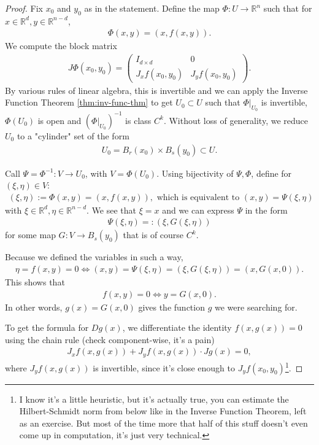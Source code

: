 \begin{proof}
	Fix $x_{0}$ and $y_{0}$ as in the statement. Define the map $\Phi: U \to \mathbb{R}^{n}$ such that for $x \in \mathbb{R}^{d}, y \in \mathbb{R}^{n-d}$,
	\begin{align*}
		\Phi(x,y) = (x, f(x,y)).
	\end{align*}
	We compute the block matrix
	\begin{align*}
		J\Phi(x_{0}, y_{0}) =
		\left(\begin{array}{c|c}
				      I_{d \times d}              & 0                    \\
				      \hline J_{x}f(x_{0}, y_{0}) & J_{y}f(x_{0}, y_{0})
			      \end{array}\right).
	\end{align*}
	By various rules of linear algebra, this is invertible and we can apply the Inverse Function Theorem \ref{thm:inv-func-thm} to get $U_{0} \subset U$ such that $\Phi|_{U_{0}}$ is invertible, $\Phi(U_{0})$ is open and $(\Phi|_{U_{0}})^{-1}$ is class $C^{k}$. Without loss of generality, we reduce $U_{0}$ to a "cylinder" set of the form
    \begin{align*}
        U_{0} = B_{r}(x_{0}) \times B_{s}(y_{0}) \subset U.
    \end{align*}

	Call $\Psi = \Phi^{-1}: V \to U_{0}$, with $V = \Phi(U_{0})$. Using bijectivity of $\Psi, \Phi$, define for $(\xi, \eta) \in V$:
	\begin{align*}
		(\xi, \eta) := \Phi(x,y) = (x, f(x,y)), \text{ which is equivalent to } (x,y) = \Psi(\xi, \eta)
	\end{align*}
	with $\xi  \in \mathbb{R}^{d}, \eta \in \mathbb{R}^{n-d}$. We see that $\xi = x$ and we can express $\Psi$ in the form
	\begin{align*}
		\Psi(\xi, \eta) =: (\xi, G(\xi, \eta))
	\end{align*}
	for some map $G: V \to B_{s}(y_{0})$ that is of course $C^{k}$. 

	Because we defined the variables in such a way, 
	\begin{align*}
		\eta = f(x,y) = 0 \iff (x,y) = \Psi(\xi, \eta) = (\xi, G(\xi, \eta)) = (x, G(x, 0)).
	\end{align*}
	This shows that
	\begin{align*}
		f(x,y) = 0 \iff y = G(x,0).
	\end{align*}
    In other words, $g(x) = G(x,0)$ gives the function $g$ we were searching for.

	To get the formula for $Dg(x)$, we differentiate the identity $f(x,g(x)) = 0$ using the chain rule (check component-wise, it's a pain)
	\begin{align*}
		J_{x}f(x,g(x)) + J_{y}f(x,g(x)) \cdot Jg(x) = 0,
	\end{align*}
	where $J_{y}f(x,g(x))$ is invertible, since it's close enough to $J_{y}f(x_{0}, y_{0})$\footnote{I know it's a little heuristic, but it's actually true, you can estimate the Hilbert-Schmidt norm from below like in the Inverse Function Theorem, left as an exercise. But most of the time more that half of this stuff doesn't even come up in computation, it's just very technical.}.
\end{proof}
